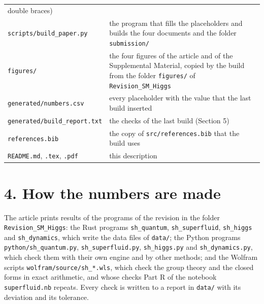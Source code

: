 \documentclass[
  10pt,
]{article}
\begin{document}
\begin{longtable}[]{@{}
  >{\raggedright\arraybackslash}p{}
  >{\raggedright\arraybackslash}p{}@{}}
double braces) \\
\texttt{scripts/build\_paper.py} & the program that fills the
placeholders and builds the four documents and the folder
\texttt{submission/} \\
\texttt{figures/} & the four figures of the article and of the
Supplemental Material, copied by the build from the folder
\texttt{figures/} of \texttt{Revision\_SM\_Higgs} \\
\texttt{generated/numbers.csv} & every placeholder with the value that
the last build inserted \\
\texttt{generated/build\_report.txt} & the checks of the last build
(Section 5) \\
\texttt{references.bib} & the copy of \texttt{src/references.bib} that
the build uses \\
\texttt{README.md}, \texttt{.tex}, \texttt{.pdf} & this description \\
\end{longtable}

\hypertarget{how-the-numbers-are-made}{%
\section{4. How the numbers are made}\label{how-the-numbers-are-made}}

The article prints results of the programs of the revision in the folder
\texttt{Revision\_SM\_Higgs}: the Rust programs \texttt{sh\_quantum},
\texttt{sh\_superfluid}, \texttt{sh\_higgs} and \texttt{sh\_dynamics},
which write the data files of \texttt{data/}; the Python programs
\texttt{python/sh\_quantum.py}, \texttt{sh\_superfluid.py},
\texttt{sh\_higgs.py} and \texttt{sh\_dynamics.py}, which check them
with their own engine and by other methods; and the Wolfram scripts
\texttt{wolfram/source/sh\_*.wls}, which check the group theory and the
closed forms in exact arithmetic, and whose checks Part R of the
notebook \texttt{superfluid.nb} repeats. Every check is written to a
report in \texttt{data/} with its deviation and its tolerance.
\end{document}
